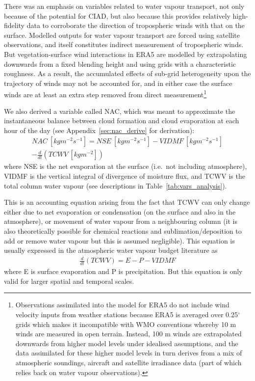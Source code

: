There was an emphasis on variables related to water vapour transport, not only because of the potential for \ac{CIAD}, but also because this provides relatively high-fidelity data to corroborate the direction of tropospheric winds with that on the surface. Modelled outputs for water vapour transport are forced using satellite observations, and itself constitutes indirect measurement of tropospheric winds. But vegetation-surface wind interactions in ERA5 are modelled by extrapolating downwards from a fixed blending height and using grids with a characteristic roughness. As a result, the accumulated effects of sub-grid heterogeneity upon the trajectory of winds may not be accounted for, and in either case the surface winds are at least an extra step removed from direct measurement\footnote{Observations assimilated into the model for ERA5 do not include wind velocity inputs from weather stations because ERA5 is averaged over 0.25$^\circ$ grids which makes it incompatible with WMO conventions whereby 10 m winds are measured in open terrain. Instead, 100 m winds are extrapolated downwards from higher model levels under idealised assumptions, and the data assimilated for these higher model levels in turn derives from a mix of atmospheric soundings, aircraft and satellite irradiance data (part of which relies back on water vapour observations).}

We also derived a variable called \ac{NAC}, which was meant to approximate the instantaneous balance between cloud formation and cloud evaporation at each hour of the day (see Appendix~\ref{sec:nac_derive} for derivation):
\begin{eqnarray}
	\label{eq:nac}
	NAC \ [kg m^{-2} s^{-1}] = NSE \ [kg m^{-2} s^{-1}] - VIDMF \ [kg m^{-2} s^{-1}] \\ 
	- \frac{d}{dt}(TCWV \ [kg m^{-2}]) \nonumber
\end{eqnarray}
where \acs{NSE} is the net evaporation at the surface (i.e.\ not including atmosphere), \acs{VIDMF} is the vertical integral of divergence of moisture flux, and \acs{TCWV} is the total column water vapour (see descriptions in Table~\ref{tab:vars_analysis}).

This is an accounting equation arising from the fact that \ac{TCWV} can only change either due to net evaporation or condensation (on the surface and also in the atmosphere), or movement of water vapour from a neighbouring column (it is also theoretically possible for chemical reactions and sublimation/deposition to add or remove water vapour but this is assumed negligible). This equation is usually expressed in the atmospheric water vapour budget literature \citep{norris2020, yan2020} as
\begin{eqnarray}
	\frac{d}{dt}(TCWV) = E - P - VIDMF
\end{eqnarray}
where E is surface evaporation and P is precipitation. But this equation is only valid for larger spatial and temporal scales. 

